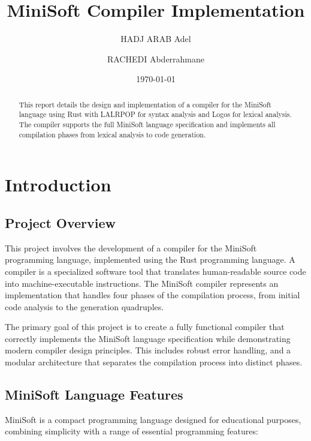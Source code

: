 \documentclass[12pt,a4paper]{article}
\begin{document}
\title{\textbf{MiniSoft Compiler Implementation}}
\author{HADJ ARAB Adel \and RACHEDI Abderrahmane}
\date{\today}
\maketitle

\begin{abstract}
	This report details the design and implementation of a compiler for the MiniSoft language using Rust with LALRPOP for syntax analysis and Logos for lexical analysis. The compiler supports the full MiniSoft language specification and implements all compilation phases from lexical analysis to code generation.
\end{abstract}

\tableofcontents
\newpage

\section{Introduction}
\subsection{Project Overview}
This project involves the development of a compiler for the MiniSoft programming language, implemented using the Rust programming language. A compiler is a specialized software tool that translates human-readable source code into machine-executable instructions. The MiniSoft compiler represents an implementation that handles four phases of the compilation process, from initial code analysis to the generation quadruples.

The primary goal of this project is to create a fully functional compiler that correctly implements the MiniSoft language specification while demonstrating modern compiler design principles. This includes robust error handling, and a modular architecture that separates the compilation process into distinct phases.

\subsection{MiniSoft Language Features}
MiniSoft is a compact programming language designed for educational purposes, combining simplicity with a range of essential programming features:
\end{document}
